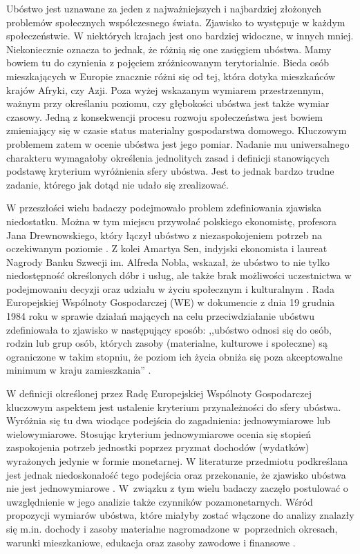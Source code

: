 Ubóstwo jest uznawane za jeden z najważniejszych i najbardziej złożonych problemów społecznych współczesnego świata. Zjawisko to występuje w każdym społeczeństwie. W niektórych krajach jest ono bardziej widoczne, w innych mniej. Niekoniecznie oznacza to jednak, że różnią się one zasięgiem ubóstwa. Mamy bowiem tu do czynienia z pojęciem zróżnicowanym terytorialnie. Bieda osób mieszkających w Europie znacznie różni się od tej, która dotyka mieszkańców krajów Afryki, czy Azji. Poza wyżej wskazanym wymiarem przestrzennym, ważnym przy określaniu poziomu, czy głębokości ubóstwa jest także wymiar czasowy. Jedną z konsekwencji procesu rozwoju społeczeństwa jest bowiem zmieniający się w czasie status materialny gospodarstwa domowego. Kluczowym problemem zatem w ocenie ubóstwa jest jego pomiar. Nadanie mu uniwersalnego charakteru wymagałoby określenia jednolitych zasad i definicji stanowiących podstawę kryterium wyróżnienia sfery ubóstwa. Jest to jednak bardzo trudne zadanie, którego jak dotąd nie udało się zrealizować.

W przeszłości wielu badaczy podejmowało problem zdefiniowania zjawiska niedostatku. Można w tym miejscu przywołać polskiego ekonomistę, profesora Jana Drewnowskiego, który łączył ubóstwo z niezaspokojeniem potrzeb na oczekiwanym poziomie \citep{drewnowski1977}. Z kolei Amartya Sen, indyjski ekonomista i laureat Nagrody Banku Szwecji im. Alfreda Nobla, wskazał, że ubóstwo to nie tylko niedostępność określonych dóbr i usług, ale także brak możliwości uczestnictwa w podejmowaniu decyzji oraz udziału w życiu społecznym i kulturalnym \citep{sen1992}. Rada Europejskiej Wspólnoty Gospodarczej (WE) w dokumencie z dnia 19 grudnia 1984 roku w sprawie działań mających na celu przeciwdziałanie ubóstwu zdefiniowała to zjawisko w następujący sposób: ,,ubóstwo odnosi się do osób, rodzin lub grup osób, których zasoby (materialne, kulturowe i społeczne) są ograniczone w takim stopniu, że poziom ich życia obniża się poza akceptowalne minimum w kraju zamieszkania'' \citep{eec1985}.

W definicji określonej przez Radę Europejskiej Wspólnoty Gospodarczej kluczowym aspektem jest ustalenie kryterium przynależności do sfery ubóstwa. Wyróżnia się tu dwa wiodące podejścia do zagadnienia: jednowymiarowe lub wielowymiarowe. Stosując kryterium jednowymiarowe ocenia się stopień zaspokojenia potrzeb jednostki poprzez pryzmat dochodów (wydatków) wyrażonych jedynie w formie monetarnej. W literaturze przedmiotu podkreślana jest jednak niedoskonałość tego podejścia oraz przekonanie, że zjawisko ubóstwa nie jest jednowymiarowe \citep{panek2010,jakosc-gus2013}. W~związku z tym wielu badaczy zaczęło postulować o uwzględnienie w jego analizie także czynników pozamonetarnych. Wśród propozycji wymiarów ubóstwa, które miałyby zostać włączone do analizy znalazły się m.in. dochody i zasoby materialne nagromadzone w~poprzednich okresach, warunki mieszkaniowe, edukacja oraz zasoby zawodowe i finansowe \citep{panek2011}. 

